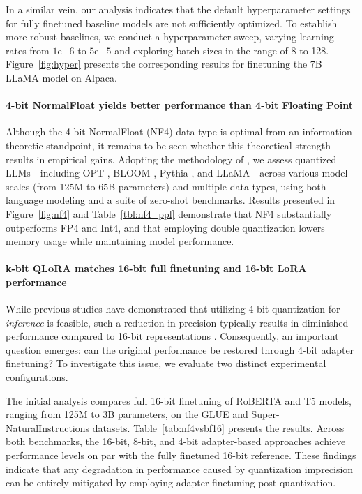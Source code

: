 In a similar vein, our analysis indicates that the default hyperparameter settings for fully finetuned baseline models are not sufficiently optimized. To establish more robust baselines, we conduct a hyperparameter sweep, varying learning rates from $1 \mathrm{e}{-6}$ to $5 \mathrm{e}{-5}$ and exploring batch sizes in the range of 8 to 128. Figure~\ref{fig:hyper} presents the corresponding results for finetuning the 7B LLaMA model on Alpaca.

\paragraph{4-bit NormalFloat yields better performance than 4-bit Floating Point} 

Although the 4-bit NormalFloat (NF4) data type is optimal from an information-theoretic standpoint, it remains to be seen whether this theoretical strength results in empirical gains. Adopting the methodology of \citet{dettmers2022case}, we assess quantized LLMs—including OPT \citep{zhang2022opt}, BLOOM \cite{scao2022bloom}, Pythia \cite{biderman2023pythia}, and LLaMA—across various model scales (from 125M to 65B parameters) and multiple data types, using both language modeling and a suite of zero-shot benchmarks. Results presented in Figure~\ref{fig:nf4} and Table~\ref{tbl:nf4_ppl} demonstrate that NF4 substantially outperforms FP4 and Int4, and that employing double quantization lowers memory usage while maintaining model performance.

\paragraph{k-bit \textsc{QLoRA} matches 16-bit full finetuning and 16-bit LoRA performance} While previous studies have demonstrated that utilizing 4-bit quantization for \emph{inference} is feasible, such a reduction in precision typically results in diminished performance compared to 16-bit representations \citep{dettmers2022case,frantar2022gptq}. Consequently, an important question emerges: can the original performance be restored through 4-bit adapter finetuning? To investigate this issue, we evaluate two distinct experimental configurations.

The initial analysis compares full 16-bit finetuning of RoBERTA and T5 models, ranging from 125M to 3B parameters, on the GLUE and Super-NaturalInstructions datasets. Table~\ref{tab:nf4vsbf16} presents the results. Across both benchmarks, the 16-bit, 8-bit, and 4-bit adapter-based approaches achieve performance levels on par with the fully finetuned 16-bit reference. These findings indicate that any degradation in performance caused by quantization imprecision can be entirely mitigated by employing adapter finetuning post-quantization.

